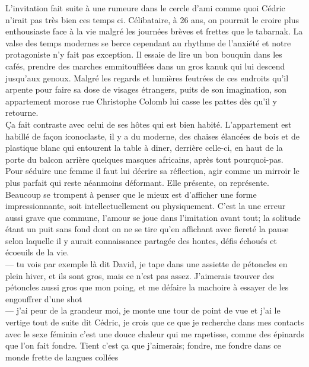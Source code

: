 \documentclass{article}
\begin{document}
L'invitation fait suite à une rumeure dans le cercle d'ami comme quoi Cédric
n'irait pas très bien ces temps ci. Célibataire, à 26 ans, on pourrait le croire
plus enthousiaste face à la vie malgré les journées brèves et frettes que le
tabarnak. La valse des temps modernes se berce cependant au rhythme de l'anxiété
et notre protagoniste n'y fait pas exception. Il essaie de lire un bon bouquin
dans les cafés, prendre des marches emmitoufflées dans un gros kanuk qui lui
descend jusqu'aux genoux. Malgré les regards et lumières feutrées de ces
endroits qu'il arpente pour faire sa dose de visages étrangers, puits de son
imagination, son appartement morose rue Christophe Colomb lui casse les pattes
dès qu'il y retourne.\\

Ça fait contraste avec celui de ses hôtes qui est bien habité. L'appartement est
habillé de façon iconoclaste, il y a du moderne, des chaises élancées de bois et
de plastique blanc qui entourent la table à diner, derrière celle-ci, en haut de
la porte du balcon arrière quelques masques africains, après tout
pourquoi-pas.\\

Pour séduire une femme il faut lui décrire sa réflection, agir comme un
mirroir le plus parfait qui reste néanmoins déformant. Elle présente,
on représente. Beaucoup se trompent à penser que le mieux est d'afficher
une forme impressionnante, soit intellectuellement ou physiquement. C'est
la une erreur aussi grave que commune, l'amour se joue dans l'imitation
avant tout; la solitude étant un puit sans fond dont on ne se tire qu'en
affichant avec fiereté la pause selon laquelle il y aurait connaissance
partagée des hontes, défis échoués et écoeuils de la vie.\\

--- tu vois par exemple là dit David, je tape dans une assiette de pétoncles
en plein hiver, et ils sont gros, mais ce n'est pas assez. J'aimerais trouver
des pétoncles aussi gros que mon poing, et me défaire la machoire à essayer de les
engouffrer d'une shot\\
--- j'ai peur de la grandeur moi, je monte une tour de point de vue et j'ai le vertige
tout de suite dit Cédric, je crois que ce que je recherche dans mes contacts avec
le sexe féminin c'est une douce chaleur qui me rapetisse, comme des épinards que l'on fait
fondre. Tient c'est ça que j'aimerais; fondre, me fondre dans ce monde frette de langues collées\\
\end{document}
